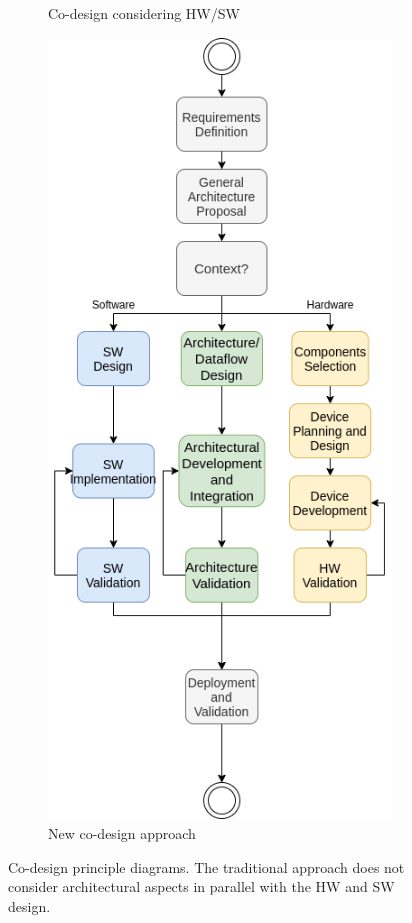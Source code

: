 \begin{figure}[ht]
\begin{subfigure}{.4\textwidth}
  \caption{Co-design considering HW/SW}
  \label{fig:codesign-1.0}
\end{subfigure}
\begin{subfigure}{.4\textwidth}
  \centering
  \includegraphics[width=\linewidth]{Figures/codesign-2.0.png}  
  \caption{New co-design approach}
  \label{fig:codesign-2.0}
\end{subfigure}
\caption{Co-design principle diagrams. The traditional approach does not consider architectural aspects in parallel with the HW and SW design.}
\label{fig:codesign-all}
\end{figure}

